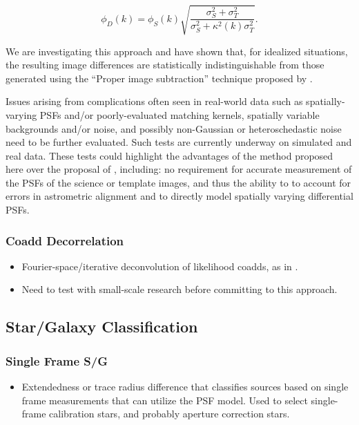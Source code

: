 \begin{equation}
  \phi_D(k) = \phi_S(k) \sqrt{\frac{\sigma_S^2+\sigma_T^2}{\sigma_S^2 + \kappa^2(k)\sigma_T^2}}.
\end{equation}

We are investigating this approach and have shown that, for idealized situations, the resulting image differences are statistically indistinguishable from those generated using the ``Proper image subtraction'' technique proposed by \cite{2016ApJ...830...27Z}.

Issues arising from complications often seen in real-world data such as spatially-varying PSFs and/or poorly-evaluated matching kernels, spatially variable backgrounds and/or noise, and possibly non-Gaussian or heteroschedastic noise need to be further evaluated. Such tests are currently underway on simulated and real data. These tests could highlight the advantages of the method proposed here over the proposal of \cite{2016ApJ...830...27Z}, including: no requirement for accurate measurement of the PSFs of the science or template images, and thus the ability to to account for errors in astrometric alignment and to directly model spatially varying differential PSFs.

\subsubsection{Coadd Decorrelation}
\label{sec:acCoaddDecorrelation}
\begin{itemize}
\item Fourier-space/iterative deconvolution of likelihood coadds, as in .
\item Need to test with small-scale research before committing to this approach.
\end{itemize}

\subsection{Star/Galaxy Classification}
\label{sec:acClassification}
\subsubsection{Single Frame S/G}
\label{sec:acSingleFrameClassification}
\begin{itemize}
\item Extendedness or trace radius difference that classifies sources based on single frame measurements that can utilize the PSF model.  Used to select single-frame calibration stars, and probably aperture correction stars.
\end{itemize}
